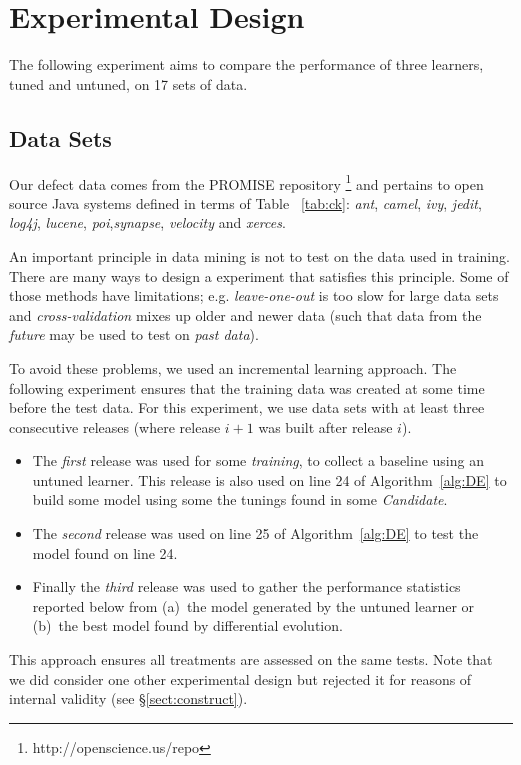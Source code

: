 \documentclass{sig-alternative}
\newcommand{\bi}{\begin{itemize}[leftmargin=0.4cm]}
\newcommand{\ei}{\end{itemize}}
\newcommand{\tion}[1]{\S\ref{sect:#1}}
\newcommand{\tab}[1]{Table ~\ref{tab:#1}}
\begin{document}
\section{Experimental Design}\label{sect:design}

The following experiment aims to compare the performance of three learners, tuned and untuned, on 17
sets of data. 

\subsection{Data Sets}\label{sect:dataa}

Our defect data comes from the PROMISE repository \footnote{http://openscience.us/repo}
and pertains to 
open source Java systems defined in terms of \tab{ck}:  {\it ant}, {\it camel}, {\it ivy}, {\it jedit}, {\it log4j}, {\it lucene},
{\it poi},{\it synapse}, {\it velocity} and {\it xerces}. 

An important principle in data mining is not to test on the data used
in training.  There are many ways to design a experiment that satisfies this principle.
Some of those methods have  limitations; e.g.
{\em leave-one-out} is too slow for large data sets and
{\em cross-validation}   mixes up older and newer data  (such that
data from the {\em future} may be used to test on {\em past data}).

To avoid these problems, we used an incremental learning approach. The following
experiment ensures that the training data was created at some time before the test
data.
For this experiment, we use data sets with at least three  
consecutive releases  (where release $i+1$ was built after release $i$).
\bi 
\item The {\em first} release was used for some  {\em training}, to collect a baseline
   using an untuned learner. This release is also used  on line 24 of Algorithm~\ref{alg:DE} to
   build some model using some the tunings found in some {\em Candidate}.
   \item The {\em second} release was used on line 25 of Algorithm~\ref{alg:DE} to 
   test the model found on line 24.
   \item Finally the {\em third} release was used to gather the performance statistics
   reported below from (a)~the model generated by the untuned learner or (b)~the
   best model found by differential evolution.
   \ei
This approach ensures   all treatments 
are assessed on the same tests. Note that we did consider
one other experimental design but rejected it for reasons of
internal validity (see \tion{construct}).
\end{document}
